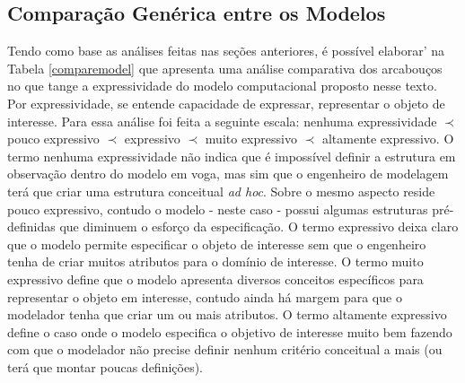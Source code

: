 \subsection{Comparação Genérica entre os Modelos}

Tendo como base as análises feitas nas seções anteriores, é possível elaborar' na Tabela \ref{comparemodel} que apresenta uma análise comparativa dos arcabouços no que tange a expressividade do modelo computacional proposto nesse texto. Por expressividade, se entende capacidade de expressar, representar o objeto de interesse. Para essa análise 
foi feita a seguinte escala: nenhuma expressividade $\prec$ pouco expressivo $\prec$ expressivo $\prec$ muito expressivo $\prec$ altamente expressivo. O termo nenhuma expressividade não indica que é impossível definir a estrutura em observação dentro do modelo em voga, mas sim que o engenheiro de modelagem terá que criar uma estrutura conceitual \textit{ad hoc}. Sobre o mesmo aspecto reside pouco expressivo, contudo o modelo - neste caso - possui algumas estruturas pré-definidas que diminuem o esforço da especificação. O termo expressivo deixa claro que o modelo permite especificar o objeto de interesse sem que o engenheiro tenha de criar muitos atributos para o domínio de interesse. O termo muito expressivo define que o modelo apresenta diversos conceitos específicos para representar o objeto em interesse, contudo ainda há margem para que o modelador tenha que criar um ou mais atributos. O termo altamente expressivo define o caso onde o modelo especifica o objetivo de interesse muito bem fazendo com que o modelador não precise definir nenhum critério conceitual a mais (ou terá que montar poucas definições).   

